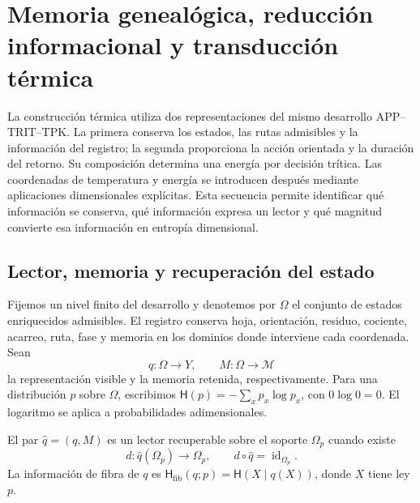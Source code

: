 
\section{Memoria genealógica, reducción informacional y transducción térmica}
\label{v:ant:sec:ii-kb-aut-desarrollo}

La construcción térmica utiliza dos representaciones del mismo desarrollo
APP--TRIT--TPK. La primera conserva los estados, las rutas admisibles y
la información del registro; la segunda proporciona la acción orientada
y la duración del retorno. Su composición determina una energía por
decisión trítica. Las coordenadas de temperatura y energía se introducen
después mediante aplicaciones dimensionales explícitas. Esta secuencia
permite identificar qué información se conserva, qué información expresa
un lector y qué magnitud convierte esa información en entropía dimensional.

\subsection{Lector, memoria y recuperación del estado}

Fijemos un nivel finito del desarrollo y denotemos por \(\Omega\) el
conjunto de estados enriquecidos admisibles. El registro conserva hoja,
orientación, residuo, cociente, acarreo, ruta, fase y memoria en los
dominios donde interviene cada coordenada. Sean
\[
 q:\Omega\longrightarrow Y,\qquad
 M:\Omega\longrightarrow\mathcal M
\]
la representación visible y la memoria retenida, respectivamente. Para una
distribución \(p\) sobre \(\Omega\), escribimos
\(\mathsf H(p)=-\sum_xp_x\log p_x\), con \(0\log0=0\).
El logaritmo se aplica a probabilidades adimensionales.

\begin{definition}
El par \(\widehat q=(q,M)\) es un lector recuperable sobre el soporte
\(\Omega_p\) cuando existe
\[
 d:\widehat q(\Omega_p)\longrightarrow\Omega_p,
 \qquad d\circ\widehat q=\operatorname{id}_{\Omega_p}.
\]
La información de fibra de \(q\) es
\(\mathsf H_{\mathrm{fib}}(q;p)=\mathsf H(X\mid q(X))\), donde
\(X\) tiene ley \(p\).
\end{definition}

